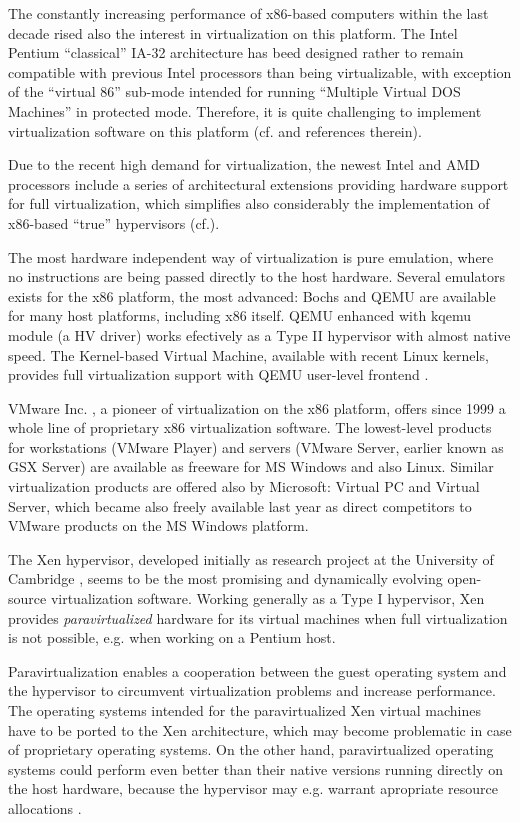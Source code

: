 \documentclass[11pt,a4paper]{llncs}
\begin{document}
The constantly increasing performance of x86-based computers within the
last decade rised also the interest in virtualization on this platform. 
The Intel Pentium ``classical'' IA-32 architecture has beed designed 
rather to remain compatible with previous Intel processors than being
virtualizable, with exception of the ``virtual 86'' sub-mode intended
for running ``Multiple Virtual DOS Machines'' in protected mode.
Therefore, it is quite challenging to implement virtualization software 
on this platform (cf. \cite{RobinIrvine2000,OpSysRev40_2} and references
therein).


Due to the recent high demand for virtualization, the newest Intel and AMD 
processors include a series of architectural extensions providing hardware 
support for full virtualization, which simplifies also considerably the 
implementation of x86-based ``true'' hypervisors (cf.\cite{ITJ10i3,AMD_SVM}).


The most hardware independent way of virtualization is pure emulation, where
no instructions are being passed directly to the host hardware. 
Several emulators exists for the x86 platform, the most advanced: 
Bochs \cite{Bochs} and QEMU \cite{QEMU} are available
for many host platforms, including x86 itself. QEMU enhanced with kqemu module
(a HV driver) works efectively as a Type II hypervisor with almost native speed.
The Kernel-based Virtual Machine, available with recent Linux kernels,  
provides full virtualization support with QEMU user-level frontend 
\cite{KVMwp}.


VMware Inc. \cite{VMware}, a pioneer of virtualization on the x86 platform, 
offers since 1999 a whole line of proprietary x86 virtualization software. 
The lowest-level products for workstations (VMware Player) and servers 
(VMware Server, earlier known as GSX Server) are available as freeware for 
MS Windows and also Linux. 
Similar virtualization products are offered also by Microsoft: Virtual PC and
Virtual Server, which became also freely available last year as direct
competitors to VMware products on the MS Windows platform.


The Xen hypervisor, developed initially as research project at the University
of Cambridge \cite{Xen2003}, seems to be the most promising and dynamically
evolving open-source virtualization software. Working generally as a Type I
hypervisor, Xen provides {\em paravirtualized} hardware for its virtual 
machines when full virtualization is not possible, e.g. when working on a 
Pentium host.


Paravirtualization enables a cooperation between the guest operating system and
the hypervisor to circumvent virtualization problems and increase performance.
The operating systems intended for the paravirtualized Xen virtual machines 
have to be ported to the Xen architecture, which may become problematic in case
of proprietary operating systems.
On the other hand, paravirtualized operating systems could perform even better
than their native versions running directly on the host hardware, because
the hypervisor may e.g. warrant apropriate resource allocations 
\cite{OpSysRev40_8}.
\end{document}
